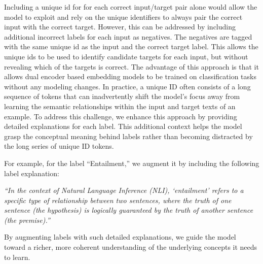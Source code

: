   Including a unique id for for each correct input/target pair alone would allow the model to exploit and rely on the unique identifiers to always pair the correct input with the correct target. However, this can be addressed by including additional incorrect labels for each input as negatives. The negatives are tagged with the same unique id as the input and the correct target label. This allows the unique ids to be used to identify candidate targets for each input, but without revealing which of the targets is correct. The advantage of this approach is that it allows dual encoder based embedding models to be trained on  classification tasks without any modeling changes. In practice, a unique ID often consists of a long sequence of tokens that can inadvertently shift the model’s focus away from learning the semantic relationships within the input and target texts of an example. To address this challenge, we enhance this approach by providing detailed explanations for each label. This additional context helps the model grasp the conceptual meaning behind labels rather than becoming distracted by the long series of unique ID tokens. 

For example, for the label “Entailment,” we augment it by including the following label explanation:

\begin{tcolorbox}[colback=blue!5!white, colframe=blue!75!black, title=Label explanation for "entailment"]
\textit{“In the context of Natural Language Inference (NLI), ‘entailment’ refers to a specific type of relationship between two sentences, where the truth of one sentence (the hypothesis) is logically guaranteed by the truth of another sentence (the premise).”}
\end{tcolorbox}
By augmenting labels with such detailed explanations, we guide the model toward a richer, more coherent understanding of the underlying concepts it needs to learn.